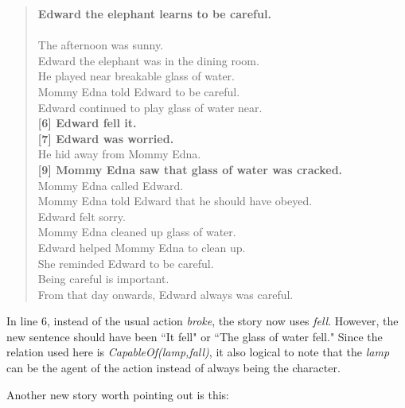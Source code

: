 \begin{verse}
\textbf{Edward the elephant learns to be careful.}\\
~\\
[1]  The afternoon was sunny.\\
[2]  Edward the elephant was in the dining room.\\
[3]  He played near breakable glass of water.\\
[4]  Mommy Edna told Edward to be careful.\\
[5]  Edward continued to play glass of water near.\\
\textbf{[6]  Edward fell it.}\\
\textbf{[7]  Edward was worried.}\\
[8]  He hid away from Mommy Edna.\\
\textbf{[9]  Mommy Edna saw that glass of water was cracked.}\\
[10] Mommy Edna called Edward.\\
[11] Mommy Edna told Edward that he should have obeyed.\\
[12] Edward felt sorry.\\
[13] Mommy Edna cleaned up glass of water.\\
[14] Edward helped Mommy Edna to clean up.\\
[15] She reminded Edward to be careful.\\
[16] Being careful is important.\\
[17] From that day onwards, Edward always was careful.
\end{verse}

In line 6, instead of the usual action \textit{broke}, the story now uses \textit{fell}. However, the new sentence should have been ``It fell" or ``The glass of water fell." Since the relation used here is \textit{CapableOf(lamp,fall)}, it also logical to note that the \textit{lamp} can be the agent of the action instead of always being the character. 

Another new story worth pointing out is this:

